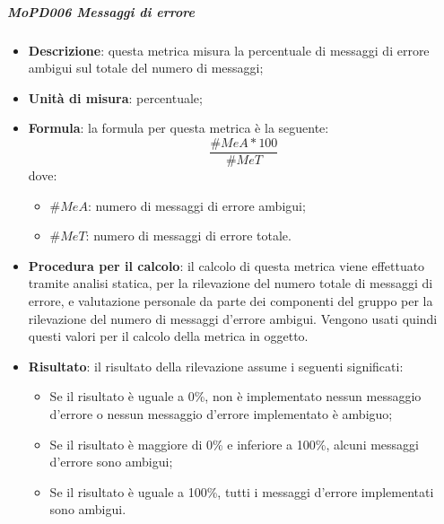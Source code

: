 \documentclass[../norme-di-progetto.tex]{subfiles}
\begin{document}
\subparagraph{MoPD006 Messaggi di errore}
\begin{itemize}
  \item \textbf{Descrizione}: questa metrica misura la percentuale di messaggi di errore ambigui sul totale del numero di messaggi;
  \item \textbf{Unità di misura}: percentuale;
  \item \textbf{Formula}: la formula per questa metrica è la seguente:
  \begin{displaymath}
    \frac{\#MeA * 100}{\#MeT}
  \end{displaymath}
  dove:
  \begin{itemize}
    \item $ \#MeA $: numero di messaggi di errore ambigui;
    \item $ \#MeT $: numero di messaggi di errore totale.
  \end{itemize}
  \item \textbf{Procedura per il calcolo}: il calcolo di questa metrica viene effettuato tramite analisi statica, per la rilevazione del numero totale di messaggi di errore, e valutazione personale da parte dei componenti del gruppo per la rilevazione del numero di messaggi d'errore ambigui. Vengono usati quindi questi valori per il calcolo della metrica in oggetto.
  \item \textbf{Risultato}: il risultato della rilevazione assume i seguenti significati:
  \begin{itemize}
    \item Se il risultato è uguale a 0\%, non è implementato nessun messaggio d'errore o nessun messaggio d'errore implementato è ambiguo;
    \item Se il risultato è maggiore di 0\% e inferiore a 100\%, alcuni messaggi d'errore sono ambigui;
    \item Se il risultato è uguale a 100\%, tutti i messaggi d'errore implementati sono ambigui.
  \end{itemize}
\end{itemize}
\end{document}
